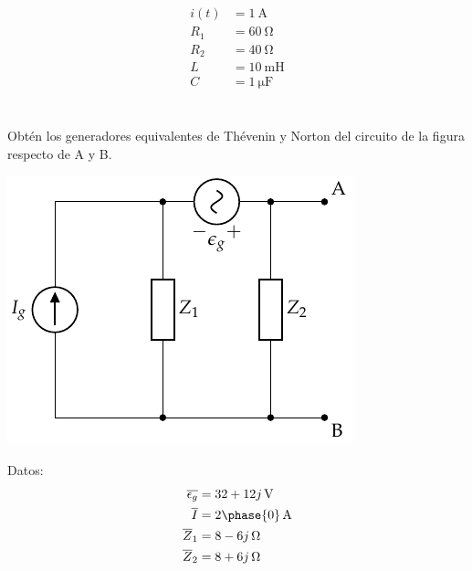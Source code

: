 \documentclass[12pt]{article}
\begin{document}
\begin{align*}
  i(t) &= \SI{1}{\ampere}\\
  R_1 &= \SI{60}{\ohm}\\
  R_2 &= \SI{40}{\ohm}\\
  L &= \SI{10}{\milli\henry}\\
  C &= \SI{1}{\micro\farad}
\end{align*}

\noindent\hrulefill

\clearpage

\section{}

Obtén los generadores equivalentes de Thévenin y Norton del circuito de la figura respecto de A y B.

\begin{center}
\includegraphics{figs/Thevenin3}
\end{center}

Datos:
\begin{align*}
  \overline{\epsilon_g} &= \SI[parse-numbers=false]{32 + 12j}{\volt}\\
  \overline{I} &= \SI[parse-numbers=false]{2\phase{0}}{\ampere}\\
  \overline{Z}_1 &= \SI[parse-numbers=false]{8 - 6j}{\ohm}\\
  \overline{Z}_2 &= \SI[parse-numbers=false]{8 + 6j}{\ohm}
\end{align*}

\noindent\hrulefill

\clearpage

\section{}
\end{document}
